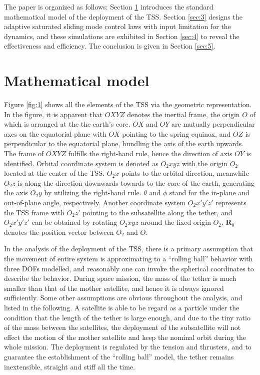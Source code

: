 \documentclass[Journal,letterpaper]{ascelike-new}
\theoremstyle{plain}
\theoremstyle{remark}
\begin{document}
The paper is organized as follows: Section \ref{sec:2} introduces the standard mathematical model of the deployment of the TSS. Section \ref{sec:3} designs the adaptive saturated sliding mode control laws with input limitation for the dynamics, and these simulations are exhibited in Section \ref{sec:4} to reveal the effectiveness and efficiency. The conclusion is given in Section \ref{sec:5}.
\section{Mathematical model}\label{sec:2}
Figure \ref{fig:1} shows all the elements of the TSS via the geometric representation. In the figure, it is apparent that $OXYZ$ denotes the inertial frame, the origin $O$ of which is arranged at the the earth's core. $OX$ and $OY$ are mutually perpendicular axes on the equatorial plane with $OX$ pointing to the spring equinox, and $OZ$ is perpendicular to the equatorial plane, bundling the axis of the earth upwards. The frame of $OXYZ$ fulfills the right-hand rule, hence the direction of axis $OY$ is identified. Orbital coordinate system is denoted as $O_2xyz$ with the origin $O_2$ located at the center of the TSS. $O_2x$ points to the orbital direction, meanwhile $O_2z$ is along the direction downwards towards to the core of the earth, generating the axis $O_2y$ by utilizing the right-hand rule. $\theta$ and $\phi$ stand for the in-plane and out-of-plane angle, respectively. Another coordinate system $O_2x'y'z'$ represents the TSS frame with $O_2z'$ pointing to the subsatellite along the tether, and $O_2x'y'z'$ can be obtained by rotating $O_2xyz$ around the fixed origin $O_2$. $\bm R_0$ denotes the position vector between $O_2$ and $O$.\par
In the analysis of the deployment of the TSS, there is a primary assumption that the movement of entire system is approximating to a ``rolling ball'' behavior with three DOFs modelled, and reasonably one can invoke the spherical coordinates to describe the behavior. During space mission, the mass of the tether is much smaller than that of the mother satellite, and hence it is always ignored sufficiently. Some other assumptions are obvious throughout the analysis, and listed in the following. A satellite is able to be regard as a particle under the condition that the length of the tether is large enough, and due to the tiny ratio of the mass between the satellites, the deployment of the subsatellite will not effect the motion of the mother satellite and keep the nominal orbit during the whole mission. The deployment is regulated by the tension and thrusters, and to guarantee the establishment of the ``rolling ball'' model, the tether remains inextensible, straight and stiff all the time.\par
\end{document}
